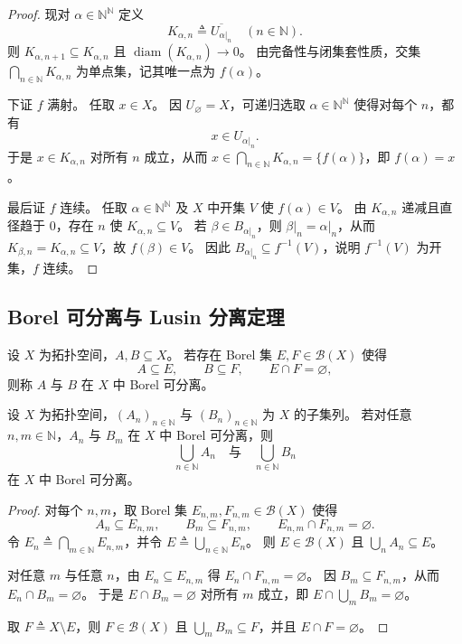 \documentclass[lang=cn,a4paper,newtx,figureplace=section,tableplace=section]{elegantbook}
\begin{document}
\begin{proof}
  现对 $\alpha\in\mathbb{N}^{\mathbb{N}}$ 定义
  \[
    K_{\alpha,n}\triangleq\overline{U_{\alpha\vert_n}}\quad(n\in\mathbb{N}).
  \]
  则 $K_{\alpha,n+1}\subseteq K_{\alpha,n}$ 且 $\operatorname{diam}(K_{\alpha,n})\to 0$。
  由完备性与闭集套性质，交集 $\bigcap_{n\in\mathbb{N}}K_{\alpha,n}$ 为单点集，记其唯一点为 $f(\alpha)$。

  下证 $f$ 满射。
  任取 $x\in X$。
  因 $U_\varnothing=X$，可递归选取 $\alpha\in\mathbb{N}^{\mathbb{N}}$ 使得对每个 $n$，都有
  \[
    x\in U_{\alpha\vert_n}.
  \]
  于是 $x\in K_{\alpha,n}$ 对所有 $n$ 成立，从而 $x\in\bigcap_{n\in\mathbb{N}}K_{\alpha,n}=\{f(\alpha)\}$，即 $f(\alpha)=x$。

  最后证 $f$ 连续。
  任取 $\alpha\in\mathbb{N}^{\mathbb{N}}$ 及 $X$ 中开集 $V$ 使 $f(\alpha)\in V$。
  由 $K_{\alpha,n}$ 递减且直径趋于 $0$，存在 $n$ 使 $K_{\alpha,n}\subseteq V$。
  若 $\beta\in B_{\alpha\vert_n}$，则 $\beta\vert_n=\alpha\vert_n$，从而 $K_{\beta,n}=K_{\alpha,n}\subseteq V$，故 $f(\beta)\in V$。
  因此 $B_{\alpha\vert_n}\subseteq f^{-1}(V)$，说明 $f^{-1}(V)$ 为开集，$f$ 连续。
\end{proof}

\subsection{Borel 可分离与 Lusin 分离定理}

\begin{definition}\label{def:borel-separable}
  设 $X$ 为拓扑空间，$A,B\subseteq X$。
  若存在 Borel 集 $E,F\in\mathcal{B}(X)$ 使得
  \[
    A\subseteq E,\qquad B\subseteq F,\qquad E\cap F=\varnothing,
  \]
  则称 $A$ 与 $B$ 在 $X$ 中 Borel 可分离。
\end{definition}

\begin{proposition}\label{prop:borel-separable-countable-union}
  设 $X$ 为拓扑空间，$(A_n)_{n\in\mathbb{N}}$ 与 $(B_n)_{n\in\mathbb{N}}$ 为 $X$ 的子集列。
  若对任意 $n,m\in\mathbb{N}$，$A_n$ 与 $B_m$ 在 $X$ 中 Borel 可分离，则
  \[
    \bigcup_{n\in\mathbb{N}}A_n\quad\text{与}\quad\bigcup_{n\in\mathbb{N}}B_n
  \]
  在 $X$ 中 Borel 可分离。
\end{proposition}

\begin{proof}
  对每个 $n,m$，取 Borel 集 $E_{n,m},F_{n,m}\in\mathcal{B}(X)$ 使得
  \[
    A_n\subseteq E_{n,m},\qquad B_m\subseteq F_{n,m},\qquad E_{n,m}\cap F_{n,m}=\varnothing.
  \]
  令 $E_n\triangleq\bigcap_{m\in\mathbb{N}}E_{n,m}$，并令 $E\triangleq\bigcup_{n\in\mathbb{N}}E_n$。
  则 $E\in\mathcal{B}(X)$ 且 $\bigcup_n A_n\subseteq E$。

  对任意 $m$ 与任意 $n$，由 $E_n\subseteq E_{n,m}$ 得 $E_n\cap F_{n,m}=\varnothing$。
  因 $B_m\subseteq F_{n,m}$，从而 $E_n\cap B_m=\varnothing$。
  于是 $E\cap B_m=\varnothing$ 对所有 $m$ 成立，即 $E\cap\bigcup_m B_m=\varnothing$。

  取 $F\triangleq X\setminus E$，则 $F\in\mathcal{B}(X)$ 且 $\bigcup_m B_m\subseteq F$，并且 $E\cap F=\varnothing$。
\end{proof}
\end{document}
